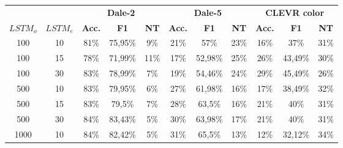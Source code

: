 \begin{table}[ht]
    \centering
    \begin{tabular}{cc|ccc|ccc|ccc}
        \toprule
                 &          & \multicolumn{3}{c}{\textbf{Dale-2}} & \multicolumn{3}{c}{\textbf{Dale-5}} & \multicolumn{3}{c}{\textbf{CLEVR color}}                                                                                         \\  \cmidrule(lr){3-5}\cmidrule(lr){6-8}\cmidrule(lr){9-11}
        $LSTM_o$ & $LSTM_e$ & \textbf{Acc.}                       & \textbf{F1}                         & \textbf{NT}                              & \textbf{Acc.} & \textbf{F1} & \textbf{NT} & \textbf{Acc.} & \textbf{F1} & \textbf{NT} \\\midrule
        {100}    & {10}     & {81\%}                              & {75,95\%}                           & {9\%}                                    & {21\%}        & {57\%}      & {23\%}      & {16\%}        & {37\%}      & {31\%}      \\
        {100}    & {15}     & {78\%}                              & {71,99\%}                           & {11\%}                                   & {17\%}        & {52,98\%}   & {25\%}      & {26\%}        & {43,49\%}   & {30\%}      \\
        {100}    & {30}     & {83\%}                              & {78,99\%}                           & {7\%}                                    & {19\%}        & {54,46\%}   & {24\%}      & {29\%}        & {45,49\%}   & {26\%}      \\
        {500}    & {10}     & {83\%}                              & {79,95\%}                           & {6\%}                                    & {27\%}        & {61,98\%}   & {16\%}      & {17\%}        & {38,49\%}   & {32\%}      \\
        {500}    & {15}     & {83\%}                              & {79,5\%}                            & {7\%}                                    & {28\%}        & {63,5\%}    & {16\%}      & {21\%}        & {40\%}      & {31\%}      \\
        {500}    & {30}     & {84\%}                              & {83,43\%}                           & {5\%}                                    & {30\%}        & {63,98\%}   & {17\%}      & {21\%}        & {40\%}      & {31\%}      \\
        {1000}   & {10}     & {84\%}                              & {82,42\%}                           & {5\%}                                    & {31\%}        & {65,5\%}    & {13\%}      & {12\%}        & {32,12\%}   & {34\%}      \\

\end{tabular}
\end{table}
